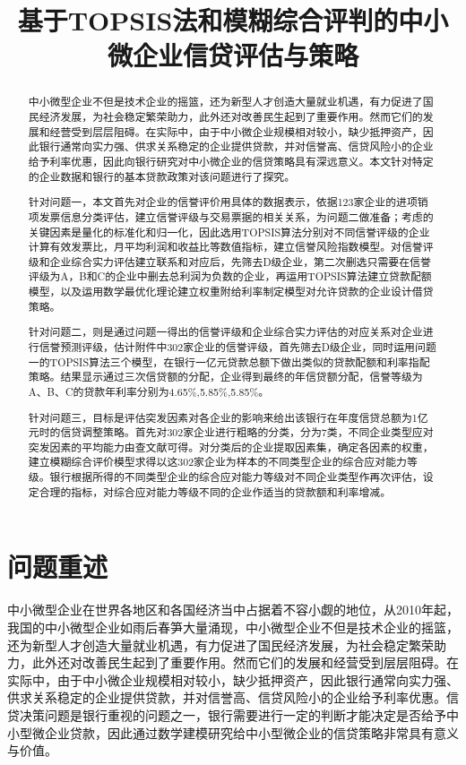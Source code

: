 \documentclass{cumcmthesis}
\title{基于TOPSIS法和模糊综合评判的中小微企业信贷评估与策略}
\begin{document}
\maketitle
\begin{abstract}
中小微型企业不但是技术企业的摇篮，还为新型人才创造大量就业机遇，有力促进了国民经济发展，为社会稳定繁荣助力，此外还对改善民生起到了重要作用。然而它们的发展和经营受到层层阻碍。在实际中，由于中小微企业规模相对较小，缺少抵押资产，因此银行通常向实力强、供求关系稳定的企业提供贷款，并对信誉高、信贷风险小的企业给予利率优惠，因此向银行研究对中小微企业的信贷策略具有深远意义。本文针对特定的企业数据和银行的基本贷款政策对该问题进行了探究。

针对问题一，本文首先对企业的信誉评价用具体的数据表示，依据123家企业的进项销项发票信息分类评估，建立信誉评级与交易票据的相关关系，为问题二做准备；考虑的关键因素是量化的标准化和归一化，因此选用TOPSIS算法分别对不同信誉评级的企业计算有效发票比，月平均利润和收益比等数值指标，建立信誉风险指数模型。对信誉评级和企业综合实力评估建立联系和对应后，先筛去D级企业，第二次删选只需要在信誉评级为A，B和C的企业中删去总利润为负数的企业，再运用TOPSIS算法建立贷款配额模型，以及运用数学最优化理论建立权重附给利率制定模型对允许贷款的企业设计借贷策略。

针对问题二，则是通过问题一得出的信誉评级和企业综合实力评估的对应关系对企业进行信誉预测评级，估计附件中302家企业的信誉评级，首先筛去D级企业，同时运用问题一的TOPSIS算法三个模型，在银行一亿元贷款总额下做出类似的贷款配额和利率指配策略。结果显示通过三次信贷额的分配，企业得到最终的年信贷额分配，信誉等级为A、B、C的贷款年利率分别为4.65$\%$,5.85$\%$,5.85$\%$。

针对问题三，目标是评估突发因素对各企业的影响来给出该银行在年度信贷总额为1亿元时的信贷调整策略。首先对302家企业进行粗略的分类，分为7类，不同企业类型应对突发因素的平均能力由查文献可得。对分类后的企业提取因素集，确定各因素的权重，建立模糊综合评价模型求得以这302家企业为样本的不同类型企业的综合应对能力等级。银行根据所得的不同类型企业的综合应对能力等级对不同企业类型作再次评估，设定合理的指标，对综合应对能力等级不同的企业作适当的贷款额和利率增减。

\end{abstract}

\section{问题重述}
中小微型企业在世界各地区和各国经济当中占据着不容小觑的地位，从2010年起，我国的中小微型企业如雨后春笋大量涌现，中小微型企业不但是技术企业的摇篮，还为新型人才创造大量就业机遇，有力促进了国民经济发展，为社会稳定繁荣助力，此外还对改善民生起到了重要作用。然而它们的发展和经营受到层层阻碍。在实际中，由于中小微企业规模相对较小，缺少抵押资产，因此银行通常向实力强、供求关系稳定的企业提供贷款，并对信誉高、信贷风险小的企业给予利率优惠。信贷决策问题是银行重视的问题之一，银行需要进行一定的判断才能决定是否给予中小型微企业贷款，因此通过数学建模研究给中小型微企业的信贷策略非常具有意义与价值。
\end{document}
